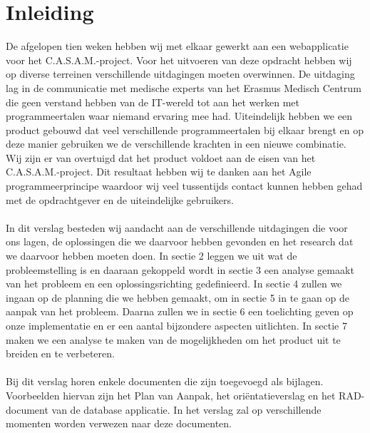 \section{Inleiding}
\label{inleiding}
De afgelopen tien weken hebben wij met elkaar gewerkt aan een webapplicatie voor het C.A.S.A.M.-project. 
Voor het uitvoeren van deze opdracht hebben wij op diverse terreinen verschillende uitdagingen moeten overwinnen. 
De uitdaging lag in de communicatie met medische experts van het Erasmus Medisch Centrum die geen verstand hebben van de IT-wereld tot aan het werken met programmeertalen waar niemand ervaring mee had. 
Uiteindelijk hebben we een product gebouwd dat veel verschillende programmeertalen bij elkaar brengt en op deze manier gebruiken we de verschillende krachten in een nieuwe combinatie. 
Wij zijn er van overtuigd dat het product voldoet aan de eisen van het C.A.S.A.M.-project. 
Dit resultaat hebben wij te danken aan het Agile programmeerprincipe waardoor wij veel tussentijds contact kunnen hebben gehad met de opdrachtgever en de uiteindelijke gebruikers.
\\
\\
In dit verslag besteden wij aandacht aan de verschillende uitdagingen die voor ons lagen, de oplossingen die we daarvoor hebben gevonden en het research dat we daarvoor hebben moeten doen. 
In sectie 2 leggen we uit wat de probleemstelling is en daaraan gekoppeld wordt in sectie 3 een analyse gemaakt van het probleem en een oplossingsrichting gedefinieerd. 
In sectie 4 zullen we ingaan op de planning die we hebben gemaakt, om in sectie 5 in te gaan op de aanpak van het probleem. 
Daarna zullen we in sectie 6 een toelichting geven op onze implementatie en er een aantal bijzondere aspecten uitlichten. 
In sectie 7 maken we een analyse te maken van de mogelijkheden om het product uit te breiden en te verbeteren. 
\\
\\
Bij dit verslag horen enkele documenten die zijn toegevoegd als bijlagen. 
Voorbeelden hiervan zijn het Plan van Aanpak, het ori\"{e}ntatieverslag en het RAD-document van de database applicatie. 
In het verslag zal op verschillende momenten worden verwezen naar deze documenten. 

